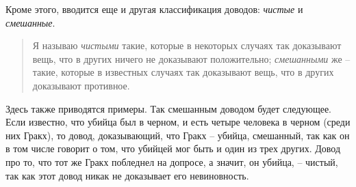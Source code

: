 \documentclass[12pt]{extarticle}
\begin{document}
Кроме этого, вводится еще и другая классификация доводов: \textit{чистые} и \textit{смешанные}.
\begin{quote}
	Я называю \textit{чистыми} такие, которые в некоторых случаях так доказывают вещь, что в других ничего не доказывают положительно; 
	\textit{смешанными} же -- такие, которые в известных случаях так доказывают вещь, что в других доказывают противное.
\end{quote}
Здесь также приводятся примеры. 
Так смешанным доводом будет следующее. Если известно, что убийца был в черном, и есть четыре человека в черном (среди них Гракх), то довод, доказывающий, что Гракх -- убийца, смешанный, так как он в том числе говорит о том, что убийцей мог быть и один из трех других.
Довод про то, что тот же Гракх побледнел на допросе, а значит, он убийца,  -- чистый, так как этот довод никак не доказывает его невиновность.
\end{document}
